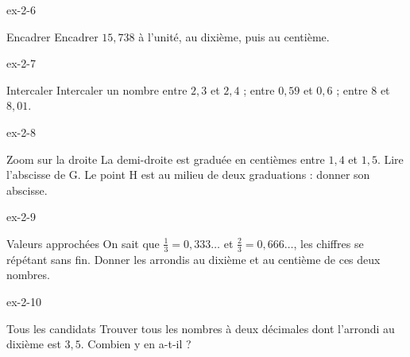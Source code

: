 \begin{blocLivre}{ex-2-6}\begin{exercice}[2]{Encadrer}
Encadrer $15{,}738$ à l’unité, au dixième, puis au centième.
\end{exercice}\end{blocLivre}
\begin{blocLivre}{ex-2-7}\begin{exercice}[2]{Intercaler}
Intercaler un nombre entre $2{,}3$ et $2{,}4$ ; entre $0{,}59$ et $0{,}6$ ; entre 8 et $8{,}01$.
\end{exercice}\end{blocLivre}
\begin{blocLivre}{ex-2-8}\begin{exercice}[2]{Zoom sur la droite}
La demi-droite est graduée en centièmes entre $1{,}4$ et $1{,}5$. Lire l’abscisse de G. Le point H est au milieu de deux graduations : donner son abscisse.
\label{fig-ex-2-8}
\end{exercice}\end{blocLivre}
\begin{blocLivre}{ex-2-9}\begin{exercice}[2]{Valeurs approchées}
On sait que $\frac13=0{,}333\ldots$ et $\frac23=0{,}666\ldots$, les chiffres se répétant sans fin. Donner les arrondis au dixième et au centième de ces deux nombres.
\end{exercice}\end{blocLivre}
\begin{blocLivre}{ex-2-10}\begin{exercice}[2]{Tous les candidats}
Trouver tous les nombres à deux décimales dont l’arrondi au dixième est $3{,}5$. Combien y en a-t-il ?
\end{exercice}\end{blocLivre}

